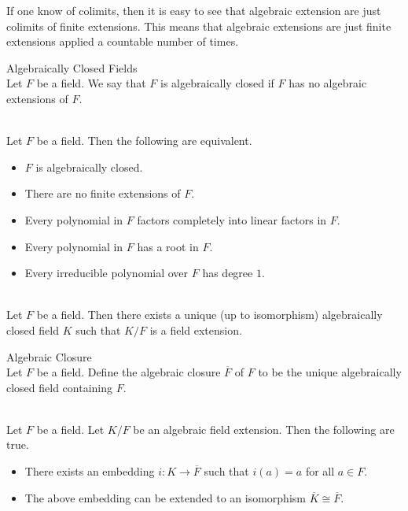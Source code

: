 \documentclass[a4paper]{article}
\begin{document}
If one know of colimits, then it is easy to see that algebraic extension are just colimits of finite extensions. This means that algebraic extensions are just finite extensions applied a countable number of times. 

\begin{defn}{Algebraically Closed Fields}{}\\
Let $F$ be a field. We say that $F$ is algebraically closed if $F$ has no algebraic extensions of $F$. 
\end{defn}

\begin{prp}{}{}\\
Let $F$ be a field. Then the following are equivalent. 
\begin{itemize}
\item $F$ is algebraically closed. 
\item There are no finite extensions of $F$. 
\item Every polynomial in $F$ factors completely into linear factors in $F$. 
\item Every polynomial in $F$ has a root in $F$. 
\item Every irreducible polynomial over $F$ has degree $1$. 
\end{itemize}
\end{prp}

\begin{prp}{}{}\\
Let $F$ be a field. Then there exists a unique (up to isomorphism) algebraically closed field $K$ such that $K/F$ is a field extension. 
\end{prp}

\begin{defn}{Algebraic Closure}{}\\
Let $F$ be a field. Define the algebraic closure $\overline{F}$ of $F$ to be the unique algebraically closed field containing $F$. 
\end{defn}

\begin{prp}{}{}\\
Let $F$ be a field. Let $K/F$ be an algebraic field extension. Then the following are true. 
\begin{itemize}
\item There exists an embedding $i:K\to\overline{F}$ such that $i(a)=a$ for all $a\in F$. 
\item The above embedding can be extended to an isomorphism $\overline{K}\cong\overline{F}$. 
\end{itemize}
\end{prp}
\end{document}
